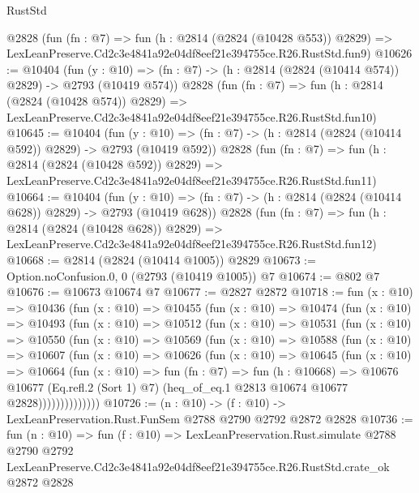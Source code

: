 \begin{lexlean}{RustStd}
\begin{coremodule}
    @2828
    (fun (fn : @7) =>
    fun (h : @2814 (@2824 (@10428 @553)) @2829) =>
    LexLeanPreserve.Cd2c3e4841a92e04df8eef21e394755ce.R26.RustStd.fun9)
@10626 := @10404
    (fun (y : @10) => (fn : @7) -> (h : @2814 (@2824 (@10414 @574)) @2829) -> @2793 (@10419 @574))
    @2828
    (fun (fn : @7) =>
    fun (h : @2814 (@2824 (@10428 @574)) @2829) =>
    LexLeanPreserve.Cd2c3e4841a92e04df8eef21e394755ce.R26.RustStd.fun10)
@10645 := @10404
    (fun (y : @10) => (fn : @7) -> (h : @2814 (@2824 (@10414 @592)) @2829) -> @2793 (@10419 @592))
    @2828
    (fun (fn : @7) =>
    fun (h : @2814 (@2824 (@10428 @592)) @2829) =>
    LexLeanPreserve.Cd2c3e4841a92e04df8eef21e394755ce.R26.RustStd.fun11)
@10664 := @10404
    (fun (y : @10) => (fn : @7) -> (h : @2814 (@2824 (@10414 @628)) @2829) -> @2793 (@10419 @628))
    @2828
    (fun (fn : @7) =>
    fun (h : @2814 (@2824 (@10428 @628)) @2829) =>
    LexLeanPreserve.Cd2c3e4841a92e04df8eef21e394755ce.R26.RustStd.fun12)
@10668 := @2814 (@2824 (@10414 @1005)) @2829
@10673 := Option.noConfusion.{0, 0} (@2793 (@10419 @1005)) @7
@10674 := @802 @7
@10676 := @10673 @10674 @7
@10677 := @2827 @2872
@10718 := fun (x : @10) =>
  @10436
    (fun (x : @10) =>
    @10455
      (fun (x : @10) =>
      @10474
        (fun (x : @10) =>
        @10493
          (fun (x : @10) =>
          @10512
            (fun (x : @10) =>
            @10531
              (fun (x : @10) =>
              @10550
                (fun (x : @10) =>
                @10569
                  (fun (x : @10) =>
                  @10588
                    (fun (x : @10) =>
                    @10607
                      (fun (x : @10) =>
                      @10626
                        (fun (x : @10) =>
                        @10645
                          (fun (x : @10) =>
                          @10664
                            (fun (x : @10) =>
                            fun (fn : @7) =>
                            fun (h : @10668) =>
                            @10676
                              @10677
                              (Eq.refl.{2} (Sort 1) @7)
                              (heq_of_eq.{1} @2813 @10674 @10677 @2828))))))))))))))
@10726 := (n : @10) -> (f : @10) -> LexLeanPreservation.Rust.FunSem @2788 @2790 @2792 @2872 @2828
@10736 := fun (n : @10) =>
  fun (f : @10) =>
  LexLeanPreservation.Rust.simulate
    @2788
    @2790
    @2792
    LexLeanPreserve.Cd2c3e4841a92e04df8eef21e394755ce.R26.RustStd.crate_ok
    @2872
    @2828
\end{coremodule}
\end{lexlean}
